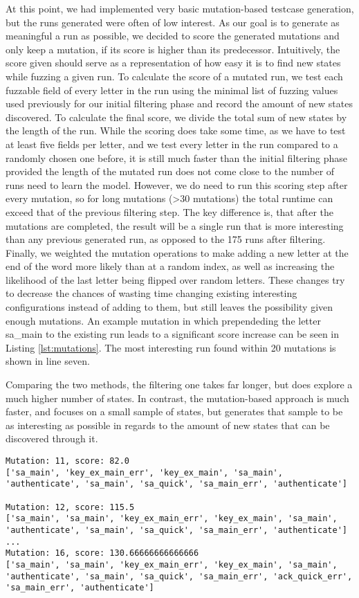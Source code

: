 At this point, we had implemented very basic mutation-based testcase generation, but the runs generated were often of low interest. As our goal is to generate as meaningful a run as possible, we decided to score the generated mutations and only keep a mutation, if its score is higher than its predecessor. Intuitively, the score given should serve as a representation of how easy it is to find new states while fuzzing a given run. To calculate the score of a mutated run, we test each fuzzable field of every letter in the run using the minimal list of fuzzing values used previously for our initial filtering phase and record the amount of new states discovered. To calculate the final score, we divide the total sum of new states by the length of the run. While the scoring does take some time, as we have to test at least five fields per letter, and we test every letter in the run compared to a randomly chosen one before, it is still much faster than the initial filtering phase provided the length of the mutated run does not come close to the number of runs need to learn the model. However, we do need to run this scoring step after every mutation, so for long mutations (>30 mutations) the total runtime can exceed that of the previous filtering step. The key difference is, that after the mutations are completed, the result will be a single run that is more interesting than any previous generated run, as opposed to the 175 runs after filtering. Finally, we weighted the mutation operations to make adding a new letter at the end of the word more likely than at a random index, as well as increasing the likelihood of the last letter being flipped over random letters. These changes try to decrease the chances of wasting time changing existing interesting configurations instead of adding to them, but still leaves the possibility given enough mutations. An example mutation in which prependeding the letter sa\_main to the existing run leads to a significant score increase can be seen in Listing \ref{lst:mutations}. The most interesting run found within 20 mutations is shown in line seven.

Comparing the two methods, the filtering one takes far longer, but does explore a much higher number of states. In contrast, the mutation-based approach is much faster, and focuses on a small sample of states, but generates that sample to be as interesting as possible in regards to the amount of new states that can be discovered through it.

\begin{lstlisting}[float=h, caption=Mutations, label=lst:mutations]
Mutation: 11, score: 82.0
['sa_main', 'key_ex_main_err', 'key_ex_main', 'sa_main', 'authenticate', 'sa_main', 'sa_quick', 'sa_main_err', 'authenticate']

Mutation: 12, score: 115.5
['sa_main', 'sa_main', 'key_ex_main_err', 'key_ex_main', 'sa_main', 'authenticate', 'sa_main', 'sa_quick', 'sa_main_err', 'authenticate']
...
Mutation: 16, score: 130.66666666666666
['sa_main', 'sa_main', 'key_ex_main_err', 'key_ex_main', 'sa_main', 'authenticate', 'sa_main', 'sa_quick', 'sa_main_err', 'ack_quick_err', 'sa_main_err', 'authenticate']
\end{lstlisting}
